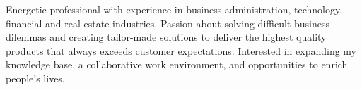 

\begin{cvparagraph}

 Energetic professional with experience in business administration, technology, financial and real estate industries.
 Passion about solving difficult business dilemmas  and creating tailor-made solutions to deliver the highest quality products that
 always exceeds customer expectations. Interested in expanding my knowledge base, a collaborative work environment, and opportunities
 to enrich people's lives.
\end{cvparagraph}
